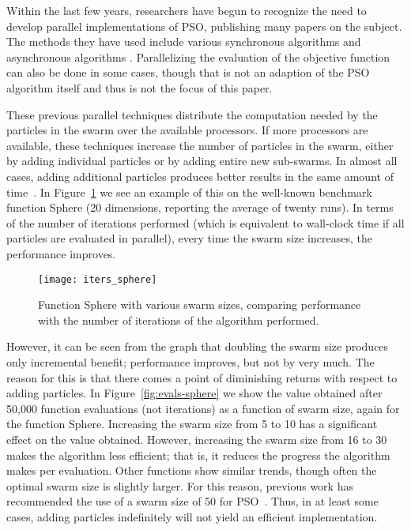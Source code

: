 \documentclass[smallcondensed]{svjour3}
\newcommand{\fig}[1]{Figure~\ref{fig:#1}}
\begin{document}
Within the last few years, researchers have begun to recognize the need to
develop parallel implementations of PSO, publishing many papers on the subject.
The methods they have used include various synchronous algorithms
\citep{chu-2006-intelligent-parallel-pso,jin-2005-pso-antenna-designs,%
parsopoulos-2004-parallel-vector-evaluated-pso,%
schutte-2004-parallel-global-optimization-with-pso} and asynchronous algorithms
\citep{mostaghim-2006-multi-objective-pso-on-grids,%
venter-2005-parallel-pso-asynchronous-evaluations}.  Parallelizing the
evaluation of the objective function can also be done in some cases, though
that is not an adaption of the PSO algorithm itself and thus is not the focus
of this paper.

These previous parallel techniques distribute the computation needed by the
particles in the swarm over the available processors.  If more processors are
available, these techniques increase the number of particles in the swarm,
either by adding individual particles or by adding entire new sub-swarms.  In
almost all cases, adding additional particles produces better results in the
same amount of time~\citep{mcnabb-2009-large-particle-swarms}.  In
\fig{iters-sphere} we see an example of this on the well-known benchmark
function Sphere (20 dimensions, reporting the average of twenty runs).  In
terms of the number of iterations performed (which is equivalent to wall-clock
time if all particles are evaluated in parallel), every time the swarm size
increases, the performance improves.

\begin{figure}
  \centering
  \texttt{[image: iters\_sphere]}
  \caption{Function Sphere with various swarm sizes, comparing performance with
  the number of iterations of the algorithm performed.}
  \label{fig:iters-sphere}
\end{figure}

However, it can be seen from the graph that doubling the swarm size produces
only incremental benefit; performance improves, but not by very much.  The
reason for this is that there comes a point of diminishing returns with respect
to adding particles.  In \fig{evals-sphere} we show the value obtained after
50,000 function evaluations (not iterations) as a function of swarm size, again
for the function Sphere.  Increasing the swarm size from 5 to 10 has a
significant effect on the value obtained.  However, increasing the swarm size
from 16 to 30 makes the algorithm less efficient; that is, it reduces the
progress the algorithm makes per evaluation.  Other functions show similar
trends, though often the optimal swarm size is slightly larger.  For this
reason, previous work has recommended the use of a swarm size of 50 for
PSO~\citep{bratton-2007-defining-a-standard-for-pso}.  Thus, in at least some
cases, adding particles indefinitely will not yield an efficient
implementation. 
\end{document}

